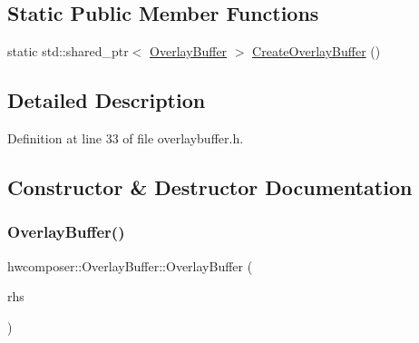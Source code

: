 \subsection*{Static Public Member Functions}
\begin{DoxyCompactItemize}
\item 
static std\+::shared\+\_\+ptr$<$ \mbox{\hyperlink{classhwcomposer_1_1OverlayBuffer}{Overlay\+Buffer}} $>$ \mbox{\hyperlink{classhwcomposer_1_1OverlayBuffer_a65693ce2be4d207ae036175a89fb66dc}{Create\+Overlay\+Buffer}} ()
\end{DoxyCompactItemize}


\subsection{Detailed Description}


Definition at line 33 of file overlaybuffer.\+h.



\subsection{Constructor \& Destructor Documentation}
\mbox{\label{classhwcomposer_1_1OverlayBuffer_a374b13f717dd877d572abb153210bc1d}} 
\subsubsection{\texorpdfstring{Overlay\+Buffer()}{OverlayBuffer()}\hspace{0.1cm}{\footnotesize\ttfamily [1/2]}}
{\footnotesize\ttfamily hwcomposer\+::\+Overlay\+Buffer\+::\+Overlay\+Buffer (\begin{DoxyParamCaption}\item[{\mbox{\hyperlink{classhwcomposer_1_1OverlayBuffer}{Overlay\+Buffer}} \&\&}]{rhs }\end{DoxyParamCaption})\hspace{0.3cm}{\ttfamily [default]}}

\mbox{\label{classhwcomposer_1_1OverlayBuffer_a8db3daed6fe18bf9ec7d707a7da8e741}} 

